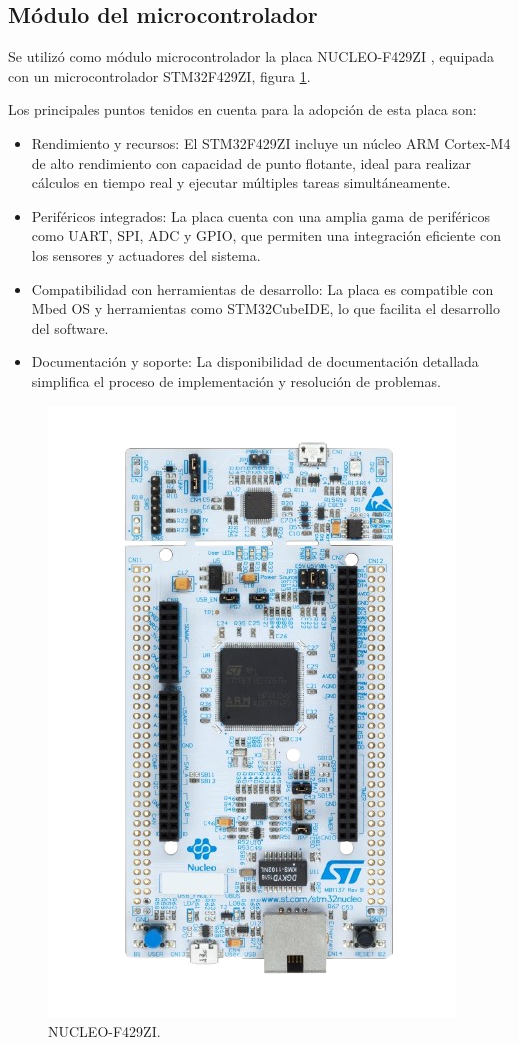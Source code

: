 \subsection{Módulo del microcontrolador}
Se utilizó como módulo microcontrolador la placa NUCLEO-F429ZI \cite{NUCLEO}, equipada con un microcontrolador STM32F429ZI, figura \ref{fig:nucleo}.

Los principales puntos tenidos en cuenta para la adopción de esta placa son:
\begin{itemize}
\item Rendimiento y recursos: El STM32F429ZI incluye un núcleo ARM Cortex-M4 de alto rendimiento con capacidad de punto flotante, ideal para realizar cálculos en tiempo real y ejecutar múltiples tareas simultáneamente.
\item Periféricos integrados: La placa cuenta con una amplia gama de periféricos como UART, SPI, ADC y GPIO, que permiten una integración eficiente con los sensores y actuadores del sistema.
\item Compatibilidad con herramientas de desarrollo: La placa es compatible con Mbed OS y herramientas como STM32CubeIDE, lo que facilita el desarrollo del software.
\item Documentación y soporte: La disponibilidad de documentación detallada simplifica el proceso de implementación y resolución de problemas.
\end{itemize}

\begin{figure}[H]
  \centering
  \includegraphics[width=0.5\linewidth]{introduccion-especifica/img/nucleo.png}
  \caption{NUCLEO-F429ZI.}
  \label{fig:nucleo}
\end{figure}

